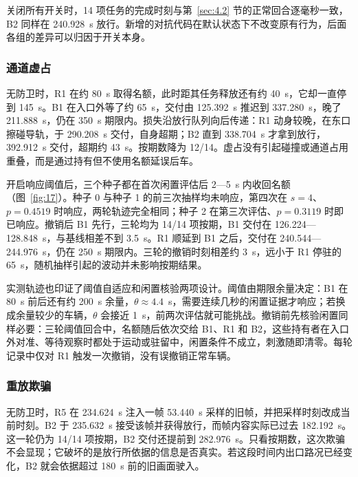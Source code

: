 关闭所有开关时，14 项任务的完成时刻与第~\ref{sec:4.2} 节的正常回合逐毫秒一致，B2 同样在 240.928~s 放行。新增的对抗代码在默认状态下不改变原有行为，后面各组的差异可以归因于开关本身。

\subsubsection*{通道虚占}

无防卫时，R1 在约 80~s 取得名额，此时距其任务释放还有约 40~s，它却一直停到 145~s。B1 在入口外等了约 65~s，交付由 125.392~s 推迟到 337.280~s，晚了 211.888~s，仍在 350~s 期限内。损失沿放行队列向后传递：R1 动身较晚，在东口擦碰导轨，于 290.208~s 交付，自身超期；B2 直到 338.704~s 才拿到放行，392.912~s 交付，超期约 43~s。按期数降为 12/14。虚占没有引起碰撞或通道占用重叠，而是通过持有但不使用名额延误后车。

开启响应阈值后，三个种子都在首次闲置评估后 2—5~s 内收回名额（图~\ref{fig:17}）。种子 0 与种子 1 的前三次抽样均未响应，第四次在 $s=4$、$p=0.4519$ 时响应，两轮轨迹完全相同；种子 2 在第三次评估、$p=0.3119$ 时即已响应。撤销后 B1 先行，三轮均为 14/14 项按期，B1 交付在 126.224—128.848~s，与基线相差不到 3.5~s。R1 顺延到 B1 之后，交付在 240.544—244.976~s，仍在 250~s 期限内。三轮的撤销时刻相差约 3~s，远小于 R1 停驻的 65~s，随机抽样引起的波动并未影响按期结果。


实测轨迹也印证了阈值自适应和闲置核验两项设计。阈值由期限余量决定：B1 在 80~s 前后还有约 200~s 余量，$\theta\approx4.4$~s，需要连续几秒的闲置证据才响应；若换成余量较少的车辆，$\theta$ 会接近 1~s，前两次评估就可能挑战。撤销前先核验闲置同样必要：三轮阈值回合中，名额随后依次交给 B1、R1 和 B2，这些持有者在入口外对准、等待观察时都处于运动或驻留中，闲置条件不成立，刺激随即清零。每轮记录中仅对 R1 触发一次撤销，没有误撤销正常车辆。

\subsubsection*{重放欺骗}

无防卫时，R5 在 234.624~s 注入一帧 53.440~s 采样的旧帧，并把采样时刻改成当前时刻。B2 于 235.632~s 接受该帧并获得放行，而帧内容实际已过去 182.192~s。这一轮仍为 14/14 项按期，B2 交付还提前到 282.976~s。只看按期数，这次欺骗不会显现；它破坏的是放行所依据的信息是否真实。若这段时间内出口路况已经变化，B2 就会依据超过 180~s 前的旧画面驶入。


